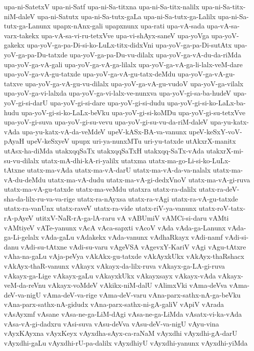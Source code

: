 {upa-ni-SatetxV
upa-ni-Satf
upa-ni-Sa-titxna
upa-ni-Sa-titx-nalilx
upa-ni-Sa-titx-niM-daleV
upa-ni-Satutx
upa-ni-Sa-tutx-gaLa
upa-ni-Sa-tutx-ga-Lalilx
upa-ni-Sa-tutx-ga-Lanunx
upapx-nAnx-gali
upapxnunx
upa-rati
upa-vA-sada
upa-vA-sa-varx-takekx
upa-vA-sa-vi-ru-tetxVve
upa-vi-shAyx-saneV
upa-yoVga
upa-yoV-gakekx
upa-yoV-ga-pa-Di-si-ko-LuLx-titx-didxVni
upa-yoV-ga-pa-Di-sutAtx
upa-yoV-ga-pa-Du-tatxde
upa-yoV-ga-pa-Du-vu-dilalx
upa-yoV-ga-vA-du-da-riMda
upa-yoV-ga-vA-gali
upa-yoV-ga-vA-ga-lilalx
upa-yoV-ga-vA-ga-li-lalx-veM-dare
upa-yoV-ga-vA-gu-tatxde
upa-yoV-ga-vA-gu-tatx-deMdu
upa-yoV-ga-vA-gu-tatxve
upa-yoV-ga-vA-gu-vu-dilalx
upa-yoV-ga-vA-gu-vudoV
upa-yoV-ga-vilalx
upa-yoV-ga-vi-lalxda
upa-yoV-ga-vi-lalx-ve-nunxva
upa-yoV-gi-sa-ba-hudeV
upa-yoV-gi-si-darU
upa-yoV-gi-si-dare
upa-yoV-gi-si-dudu
upa-yoV-gi-si-ko-LaLx-ba-hudu
upa-yoV-gi-si-ko-LaLx-beVku
upa-yoV-gi-si-koMDu
upa-yoV-gi-su-tetxVve
upa-yoV-gi-suva
upa-yoV-gi-su-vevu
upa-yoV-gi-su-vu-da-riM-daleV
upa-yu-katx-vAda
upa-yu-katx-vA-da-veMdeV
upeV-kASx-BA-va-vanunx
upeV-keSxY-voV-pAyaH
upeV-keSxyeV
upupx
uri-ya-nunxMTu
uri-yu-tatxde
utAkxrX-manitx
utAsx-ha-diMda
utakxqqSaTx
utakxqqSaTxH
utakxqq-SaTx-vAda
utakxrX-mi-su-vu-dilalx
utatx-mA-dhi-kA-ri-yalilx
utatxma
utatx-ma-go-Li-si-ko-LuLx-tAtxne
utatx-ma-vAda
utatx-ma-vA-darU
utatx-ma-vA-da-va-nalalx
utatx-ma-vA-du-deMdu
utatx-ma-vA-dudu
utatx-ma-vA-gi-dedxVnoV
utatx-ma-vA-gi-ruva
utatx-ma-vA-gu-tatxde
utatx-ma-veMdu
utatxra
utatx-ra-dalilx
utatx-ra-deV-sha-da-lilx-ru-va-va-rige
utatx-ra-nAyxsa
utatx-ra-vAgi
utatx-ra-vA-gu-tatxde
utatx-ra-vanUnx
utatx-raveV
utatx-ra-vide
utatx-riV-ya-vanunx
utatx-roV-tatx-rA-pAyeV
utitxV-NaR-rA-ga-lA-raru
vA
vABUmiV
vAMCi-si-daru
vAMti
vAMtiyeV
vATe-yanunx
vAcA
vAca-sapxti
vAcoV
vAda
vAda-ga-Lanunx
vAda-ga-Li-gelalx
vAda-gaLu
vAdakekx
vAda-vanunx
vAdhaRkayx
vAdi-namf
vAdi-si-danu
vAdi-su-tAtxne
vAdi-su-varu
vAgeVSA
vAgevxY-KariV
vAgi
vAgu-tAtxre
vAha-na-gaLu
vAja-peVya
vAkAkx-gu-tatxde
vAkAyxkUkx
vAkAyx-thaRshacx
vAkAyx-thaR-vanunx
vAkayx
vAkayx-da-lilx-ruva
vAkayx-ga-LA-gi-ruva
vAkayx-ga-Lige
vAkayx-gaLu
vAkayxkUkx
vAkayxsayx
vAkayx-vAda
vAkayx-veM-da-reVnu
vAkayx-voMdeV
vAkikx-niM-dalU
vAlimxVki
vAma-deVva
vAma-deV-va-nigU
vAma-deV-va-rige
vAma-deV-varu
vAna-parx-sathx-nA-ga-beVku
vAna-parx-sathx-nA-gidudx
vAna-parx-sathx-ni-gA-galiV
vApiV
vArada
vAsAyxmf
vAsane
vAsa-ne-ga-LiM-dAgi
vAsa-ne-ga-LiMda
vAsatx-vi-ka-vAda
vAsa-vA-gi-dadxru
vAsi-suva
vAsu-deVva
vAsu-deV-va-nigU
vAyu-vina
vAyxKAyxna
vAyxKeyx
vAyxdha-sAyx-ca-raNaM
vAyxdhi
vAyxdhi-gA-darU
vAyxdhi-gaLu
vAyxdhi-rU-pa-dalilx
vAyxdhiyU
vAyxdhi-yanunx
vAyxdhi-yiMda
}
